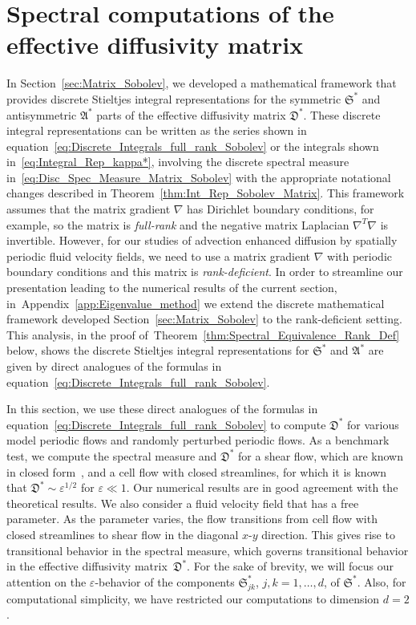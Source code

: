 \documentclass[english,12pt,jmp,graphicx]{revtex4-1}
\newcommand{\thmref}[1]{Theorem~\ref{#1}}
\newcommand{\secref}[1]{Section~\ref{#1}}
\newcommand{\appref}[1]{Appendix~\ref{#1}}
\newcommand{\Sg}{\mathfrak{S}}
\newcommand{\Ag}{\mathfrak{A}}
\newcommand{\Dg}{\mathfrak{D}}
\begin{document}
\section{Spectral computations of the effective diffusivity matrix} \label{sec:Num_Results}
%
In \secref{sec:Matrix_Sobolev}, we developed a mathematical framework
that provides discrete Stieltjes integral representations for the  
symmetric $\Sg^*$ and antisymmetric $\Ag^*$ parts of the effective
diffusivity matrix $\Dg^*$. These discrete integral representations
can be written as the series shown in
equation~\eqref{eq:Discrete_Integrals_full_rank_Sobolev} or the integrals
shown in~\eqref{eq:Integral_Rep_kappa*}, involving the discrete
spectral measure in~\eqref{eq:Disc_Spec_Measure_Matrix_Sobolev}
with the appropriate notational changes described in
\thmref{thm:Int_Rep_Sobolev_Matrix}. This framework assumes that the
matrix gradient $\nabla$ has Dirichlet boundary conditions, for
example, so the matrix is \emph{full-rank} and the negative matrix
Laplacian $\nabla^T\nabla$ is invertible. However, for our studies of
advection enhanced diffusion by spatially periodic fluid velocity
fields, we need to use a matrix gradient $\nabla$ with periodic boundary
conditions and this matrix is
\emph{rank-deficient}. In order to streamline our presentation leading
to the numerical results of the current section,
in~\appref{app:Eigenvalue_method} we extend the discrete mathematical
framework developed \secref{sec:Matrix_Sobolev} to the rank-deficient
setting. This analysis, in the proof
of~\thmref{thm:Spectral_Equivalence_Rank_Def} below, 
shows the discrete Stieltjes integral 
representations for $\Sg^*$ and $\Ag^*$ are given by
direct analogues
of the formulas in equation~\eqref{eq:Discrete_Integrals_full_rank_Sobolev}. 




In this section, we use
these direct analogues of the formulas in
equation~\eqref{eq:Discrete_Integrals_full_rank_Sobolev} 
to compute
$\Dg^*$ for various model periodic flows and randomly perturbed
periodic flows. As a benchmark test, we compute the spectral measure
and $\Dg^*$ for a shear flow, which are known in closed
form~\cite{Avellaneda:CMP-339}, and a cell flow with closed
streamlines, for which it is
known~\cite{Fannjiang:1994:SIAM_JAM:333,Fannjiang:1997:1033} that
$\Dg^*\sim\varepsilon^{1/2}$ for $\varepsilon\ll1$. Our numerical
results are in good 
agreement with the theoretical results. We also consider  
a fluid velocity field that has a free parameter. As the parameter
varies, the flow transitions from cell flow with closed streamlines to
shear flow in the diagonal $x$-$y$ direction. This gives rise to
 transitional behavior in the spectral measure, which
governs transitional behavior in the effective diffusivity
matrix~$\Dg^*$. For the sake of brevity, we will focus our attention
on the $\varepsilon$-behavior of the components $\Sg^*_{jk}$,
$j,k=1,\ldots,d$, of $\Sg^*$. Also, for computational simplicity,
we have restricted our computations to dimension $d=2$.
\end{document}
